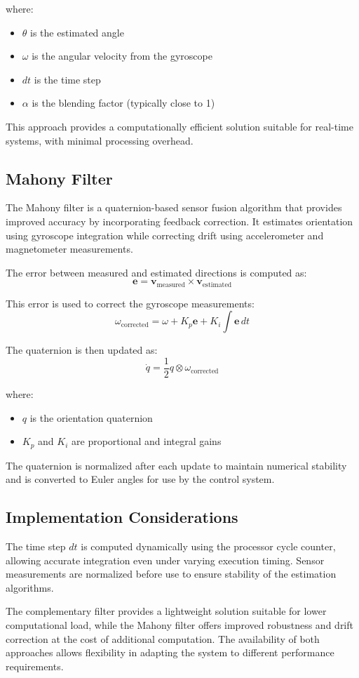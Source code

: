 where:
\begin{itemize}
    \item $\theta$ is the estimated angle
    \item $\omega$ is the angular velocity from the gyroscope
    \item $dt$ is the time step
    \item $\alpha$ is the blending factor (typically close to 1)
\end{itemize}

This approach provides a computationally efficient solution suitable for real-time systems, with minimal processing overhead.

\subsection{Mahony Filter}

The Mahony filter is a quaternion-based sensor fusion algorithm that provides improved accuracy by incorporating feedback correction. It estimates orientation using gyroscope integration while correcting drift using accelerometer and magnetometer measurements.

The error between measured and estimated directions is computed as:
\[
\mathbf{e} = \mathbf{v}_{\text{measured}} \times \mathbf{v}_{\text{estimated}}
\]

This error is used to correct the gyroscope measurements:
\[
\omega_{\text{corrected}} = \omega + K_p \mathbf{e} + K_i \int \mathbf{e} \, dt
\]

The quaternion is then updated as:
\[
\dot{q} = \frac{1}{2} q \otimes \omega_{\text{corrected}}
\]

where:
\begin{itemize}
    \item $q$ is the orientation quaternion
    \item $K_p$ and $K_i$ are proportional and integral gains
\end{itemize}

The quaternion is normalized after each update to maintain numerical stability and is converted to Euler angles for use by the control system.

\subsection{Implementation Considerations}

The time step $dt$ is computed dynamically using the processor cycle counter, allowing accurate integration even under varying execution timing. Sensor measurements are normalized before use to ensure stability of the estimation algorithms.

The complementary filter provides a lightweight solution suitable for lower computational load, while the Mahony filter offers improved robustness and drift correction at the cost of additional computation. The availability of both approaches allows flexibility in adapting the system to different performance requirements.
